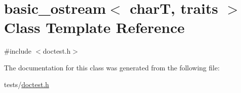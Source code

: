 \hypertarget{classbasic__ostream}{}\section{basic\+\_\+ostream$<$ charT, traits $>$ Class Template Reference}
\label{classbasic__ostream}


{\ttfamily \#include $<$doctest.\+h$>$}



The documentation for this class was generated from the following file\+:\begin{DoxyCompactItemize}
\item 
tests/\hyperlink{doctest_8h}{doctest.\+h}\end{DoxyCompactItemize}
